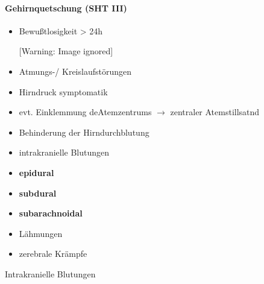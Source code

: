 \documentclass{article}
\newcommand\gT[1]{\textbf{\textup{\textcolor[rgb]{0.0,0.5019608,0.0}{#1}}}}
\begin{document}
\paragraph[Gehirnquetschung (SHT III{\textdegree})]{Gehirnquetschung
(SHT III{\textdegree})}
\begin{itemize}
\item {\mdseries
Bewu{\ss}tlosigkeit  {\textgreater}  24h}

\begin{center}
 [Warning: Image ignored] %

\end{center}
\item {\mdseries
Atmungs-/ Kreislaufst\"orungen}

\item {\mdseries
Hirndruck symptomatik}

\item {\mdseries
evt. Einklemmung deAtemzentrums ${\rightarrow}$ zentraler
Atemstillsatnd}

\item {\mdseries
Behinderung der Hirndurchblutung}

\item {\mdseries
intrakranielle Blutungen}

\end{itemize}
\begin{itemize}
\item {\mdseries
\gT{epidural}}

\item {\mdseries
\gT{subdural}}

\item {\mdseries
\gT{subarachnoidal}}

\end{itemize}
\begin{itemize}
\item {\mdseries
L\"ahmungen}

\item {\mdseries
zerebrale Kr\"ampfe}

\end{itemize}
{\mdseries\color[rgb]{0.0,0.0,0.5019608}
Intrakranielle Blutungen}
\end{document}
